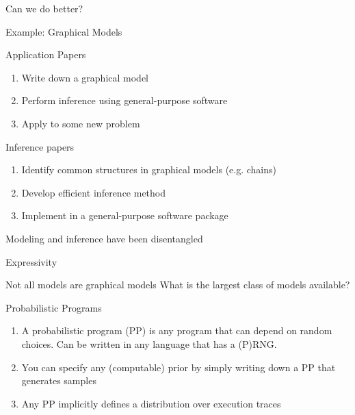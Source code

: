 \begin{frame}{Can we do better?}
  \begin{block}{Example: Graphical Models}  
  \end{block}
      \begin{block}{Application Papers}
      \begin{enumerate}
        \item Write down a graphical model
        \item Perform inference using general-purpose software
        \item Apply to some new problem
      \end{enumerate}
    \end{block}
      \begin{block}{Inference papers}
      \begin{enumerate}
        \item Identify common structures in graphical models (e.g. chains)
        \item Develop efficient inference method
        \item Implement in a general-purpose software package
      \end{enumerate}
    \end{block}  
  \begin{block}{}
      \vspace{-2\baselineskip}
  \large
    \begin{center}
    {
      {Modeling and inference have been disentangled}
    }	
    \end{center}
  \end{block}
\end{frame}



\begin{frame}{Expressivity}
  \begin{block}{Not all models are graphical models}  
  What is the largest class of models available?
  \end{block}
      \begin{block}{Probabilistic Programs}
      \begin{enumerate}
        \item A probabilistic program (PP) is any program that can depend on random choices.  Can be written in any language that has a (P)RNG.
        \item You can specify any (computable) prior by simply writing down a PP that generates samples
        \item Any PP implicitly defines a distribution over execution traces
      \end{enumerate}
    \end{block}
\end{frame}

